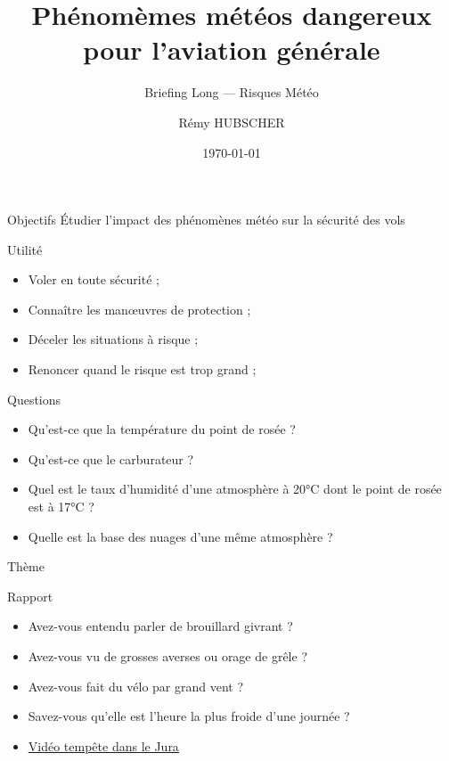 \documentclass{beamer}
\author{Rémy HUBSCHER}
\begin{document}
  \title[Briefing Long — Risques Météo]{Phénomèmes météos dangereux pour l'aviation générale}
  \subtitle{Briefing Long — Risques Météo}
\date{\today} 

\begin{frame}[plain]
  \titlepage
\end{frame}

\begin{frame}{Objectifs}
  Étudier l'impact des phénomènes météo sur la sécurité des vols
\end{frame}

\begin{frame}{Utilité}
  \begin{itemize}
    \item Voler en toute sécurité ; \pause
    \item Connaître les manœuvres de protection ; \pause
    \item Déceler les situations à risque ; \pause
    \item Renoncer quand le risque est trop grand ;
  \end{itemize}  
\end{frame}

\begin{frame}{Questions}
  \begin{itemize}
    \item Qu'est-ce que la température du point de rosée ? \pause
    \item Qu'est-ce que le carburateur ? \pause
    
    \item Quel est le taux d'humidité d'une atmosphère à 20°C dont le point de rosée est à 17°C ? \pause
    \item Quelle est la base des nuages d'une même atmosphère ?
  \end{itemize}  
\end{frame}

\begin{frame}{Thème}
  \tableofcontents
\end{frame}

\begin{frame}{Rapport}
  \begin{itemize}
    \item Avez-vous entendu parler de brouillard givrant ?
    \item Avez-vous vu de grosses averses ou orage de grêle ?
    \item Avez-vous fait du vélo par grand vent ?
    \item Savez-vous qu'elle est l'heure la plus froide d'une journée ?
    \item \href{https://www.youtube.com/watch?v=zIhQlqZ7UN8}{Vidéo tempête dans le Jura}
  \end{itemize}  
\end{frame}
\end{document}
